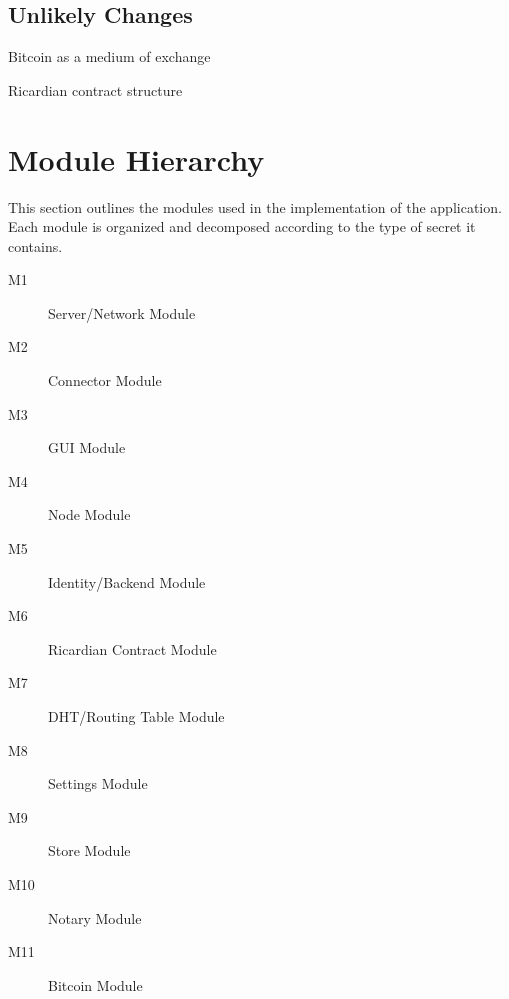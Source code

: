 \documentclass{article}
\begin{document}
\subsection{Unlikely Changes}
\begin{description}
\item[UC1]
Bitcoin as a medium of exchange

\item[UC2]
Ricardian contract structure

\item

\end{description}

\section*{Module Hierarchy}
This section outlines the modules used in the implementation of the application. Each module is organized and decomposed according to the type of secret it contains.
\begin{description}
\item[M1]
Server/Network Module
\item[M2]
Connector Module
\item[M3]
GUI Module
\item[M4]
Node Module
\item[M5]
Identity/Backend Module
\item[M6]
Ricardian Contract Module
\item[M7]
DHT/Routing Table Module
\item[M8]
Settings Module
\item[M9]
Store Module
\item[M10]
Notary Module
\item[M11]
Bitcoin Module
\end{description}
\end{document}
